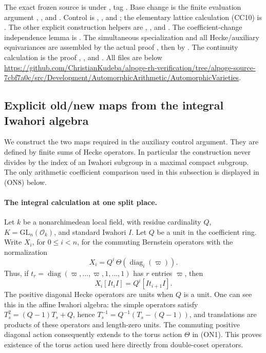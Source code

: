 The exact frozen source is under
,
tag .
Base change is the finite evaluation argument
,
, and .
Control is
, ,
and ; the elementary lattice calculation (CC10) is
.
The other explicit construction helpers are
,
,
and .
The coefficient-change independence lemma is
.
The simultaneous specialization and all Hecke/auxiliary
equivariances are assembled by the actual proof
,
then by .
The continuity calculation is the proof
,
, and .
All files are below
\url{https://github.com/ChristianKudeba/alpoge-rh-verification/tree/alpoge-source-7cbf7a0c/src/Development/AutomorphicArithmetic/AutomorphicVarieties}.


\subsection{Explicit old/new maps from the integral Iwahori algebra}
\label{sec:explicit-old-new}

We construct the two maps required in the auxiliary control argument.
They are defined by finite sums of Hecke operators.  In particular the
construction never divides by the index of an Iwahori subgroup in a
maximal compact subgroup.  The only arithmetic coefficient comparison
used in this subsection is displayed in (ON8) below.

\paragraph{The integral calculation at one split place.}
Let \(k\) be a nonarchimedean local field, with residue cardinality
\(Q\), \(K=\mathrm{GL}_n(\mathcal O_k)\), and standard Iwahori \(I\).
Let \(Q\) be a unit in the coefficient ring.
Write \(X_i\), for \(0\leq i<n\), for the commuting Bernstein operators
with the normalization
\[
 X_i=Q^i\,\Theta(\operatorname{diag}_i(\varpi)).
 \tag{ON1}
\]
Thus, if \(t_r=\operatorname{diag}(\varpi,\ldots,\varpi,1,\ldots,1)\)
has \(r\) entries \(\varpi\), then
\[
 X_i[I t_i I]=Q^i[I t_{i+1}I].
\]
The positive diagonal Hecke operators are units when \(Q\) is a unit.
One can see this in the affine Iwahori algebra: the simple operators
satisfy
\(T_s^2=(Q-1)T_s+Q\), hence
\(T_s^{-1}=Q^{-1}(T_s-(Q-1))\), and translations are products of these
operators and length-zero units.  The commuting positive diagonal
action consequently extends to the torus action \(\Theta\) in (ON1).
This proves existence of the torus action used here directly from
double-coset operators.

